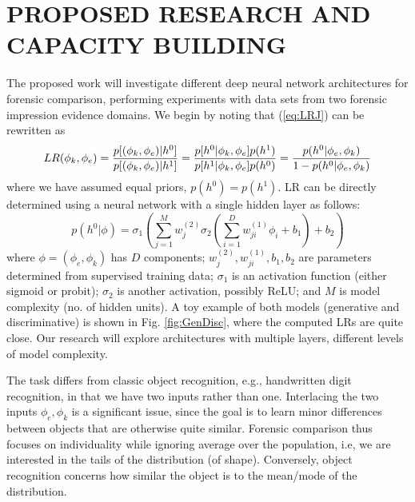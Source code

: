 \documentclass[11pt, doublespacing]{article}
\begin{document}
\section{PROPOSED RESEARCH AND CAPACITY BUILDING} 
\label{Section:proposed}
The proposed work will  investigate different deep neural network architectures  for forensic comparison, performing  experiments with data sets from two forensic impression evidence domains.
We begin by noting that (\ref{eq:LRJ}) can be rewritten as
\begin{equation}
LR(\phi_{k},\phi_{e})=\frac{p[({\bf \phi}_k,{\bf \phi}_e) | h^{0}]}{p[({\bf \phi}_k ,{\bf \phi}_e) | h^{1}]}
=\frac{p[h^{0}|\phi_k , \phi_e]p(h^{1})}{p[h^{1}|\phi_k , \phi_e]p(h^{0})}
=\frac{p(h^{0}|\phi_e , \phi_k )}{1-p(h^0 | \phi_e , \phi_k )}
\label{eq:discriminative}
\end{equation}
where we have assumed equal priors, $p(h^0 )=p(h^1)$.   LR  can be directly determined using a neural network with a single hidden layer  as follows:
\begin{equation}
p(h^{0}|\phi )=\sigma_{1} \left( \sum_{j=1}^{M} w_{j}^{(2)}\sigma_{2} \left (\sum_{i=1}^{D} w_{ji}^{(1)}\phi_{i}+b_{1} \right) + b_{2} \right)
\label{eq:neuralnet}
\end{equation}
where $\phi=(\phi_{e},\phi_{k})$ has $D$ components;   $w_{j}^{(2)}, w_{ji}^{(1)}, b_{1},b_{2}$ are parameters determined from supervised training data; $\sigma_{1}$ is an activation function (either sigmoid or probit); $\sigma_{2}$ is another activation, possibly  ReLU; and $M$ is model complexity (no. of hidden units).
A toy example of both models (generative and discriminative)  is shown in Fig. \ref{fig:GenDisc}, where the computed  LRs are quite close.  Our research will explore architectures  with multiple layers, different levels of model complexity. 

The task differs from classic object recognition, e.g., handwritten digit recognition,  in that we have two inputs rather than one. Interlacing the two inputs $\phi_{e},\phi_{k}$ is a significant issue, since the goal is to learn minor differences between objects that are otherwise quite similar.  Forensic comparison thus focuses on individuality while ignoring average over the population, i.e, we are interested in the tails of the distribution (of shape).   Conversely, object recognition concerns how similar the object is to the mean/mode of the distribution.
\end{document}
